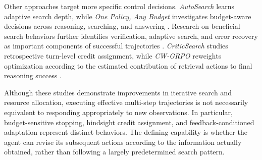Other approaches target more specific control decisions. \textit{AutoSearch} learns adaptive search depth, while \textit{One Policy, Any Budget} investigates budget-aware decisions across reasoning, searching, and answering \cite{autosearch,anysearch}. Research on beneficial search behaviors further identifies verification, adaptive search, and error recovery as important components of successful trajectories \cite{beneficial_search_behaviors}. \textit{CriticSearch} studies retrospective turn-level credit assignment, while \textit{CW-GRPO} reweights optimization according to the estimated contribution of retrieval actions to final reasoning success \cite{criticsearch,cw_grpo}.

Although these studies demonstrate improvements in iterative search and resource allocation, executing effective multi-step trajectories is not necessarily equivalent to responding appropriately to new observations. In particular, budget-sensitive stopping, hindsight credit assignment, and feedback-conditioned adaptation represent distinct behaviors. The defining capability is whether the agent can revise its subsequent actions according to the information actually obtained, rather than following a largely predetermined search pattern.
